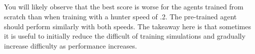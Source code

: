 \documentclass[12]{extarticle}
\begin{document}
\subsection{}

You will likely observe that the best score is worse for the agents trained from scratch than when training with a hunter speed of .2.  The pre-trained agent should perform similarly with both speeds. The takeaway here is that sometimes it is useful to initially reduce the difficult of training simulations and gradually increase difficulty as performance increases. 
\end{document}
